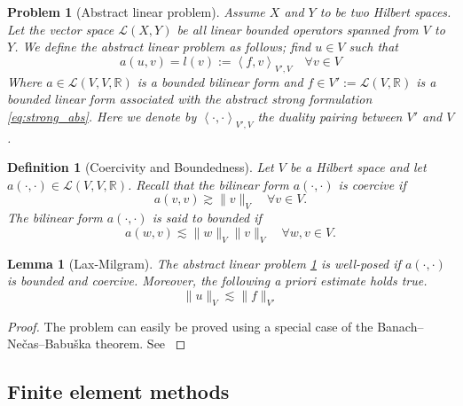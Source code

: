 \documentclass[11pt]{article}
\newtheorem{definition}[theorem]{Definition}
\newtheorem{problem}[theorem]{Problem}
\newtheorem{lemma}[theorem]{Lemma}
\theoremstyle{remark}
\numberwithin{equation}{section}
\begin{document}
\begin{problem}[Abstract linear problem]
    \label{def:abstract_linear_problem}
    Assume $X$ and $Y$  to be two Hilbert spaces. Let the vector space $\mathcal{L}( X,Y)  $ be all linear bounded operators spanned from $V$ to $Y$. We define the abstract linear problem as follows; find $u \in V$ such that
    \begin{equation}
    a( u,v)  = l(v ) := \left<f,v \right>_{V' , V}  \quad  \forall v \in V
    \end{equation}
    Where $a \in  \mathcal{L} ( V, V,\mathbb{R} ) $ is a bounded bilinear form and $f \in V':= \mathcal{L} ( V,\mathbb{R} )  $ is a bounded linear form associated with the abstract strong formulation \eqref{eq:strong_abs}. Here we denote by $\left<\cdot ,\cdot  \right>_{V',V} $ the duality pairing between $V'$ and $V$.

\end{problem}


\begin{definition}[Coercivity and Boundedness]
    \label{def:coercivity}
    Let $V$ be a Hilbert space and let $a( \cdot ,\cdot )  \in  \mathcal{L} ( V, V,\mathbb{R} )  $. Recall that the bilinear form $a( \cdot ,\cdot ) $ is coercive if \[
     a( v,v) \gtrsim  \| v \|_{ V }^{  } \quad  \forall v \in  V.
    \]
     The bilinear form $a( \cdot ,\cdot ) $ is said to bounded if   \[
    a( w,v)  \lesssim  \| w \|_{ V }^{  }  \| v \|_{V }^{  }\quad  \forall w,v \in V.
    \]
\end{definition}


\begin{lemma}[Lax-Milgram]
    \label{def:lax-milgram}
    The abstract linear problem \ref{def:abstract_linear_problem} is well-posed if $a(\cdot , \cdot  ) $ is bounded and coercive. Moreover, the following a priori estimate holds true.\[
    \| u \|_{ V }^{  } \lesssim  \| f \|_{ V'  }^{  }
    \]
\end{lemma}
\begin{proof}
    The problem can easily be proved using a special case of the Banach–Nečas–Babuška theorem. See \cite[Lemma 1.4]{pietro2012}
\end{proof}


\subsection{Finite element methods}%
\label{sub:finite_element_method}
\end{document}
